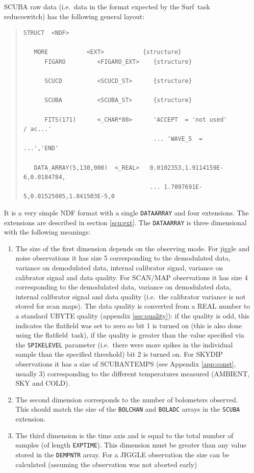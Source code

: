 \documentclass[twoside,11pt]{article}
\newenvironment{myquote}{\begin{quote}\begin{small}}{\end{small}\end{quote}}
\newcommand{\task}[1]{{\sf #1}}
\newcommand{\param}[1]{{\tt #1}}
\newcommand{\resw}{\xref{\task{reduce\_switch}}{sun216}{REDUCE_SWITCH}}
\newcommand{\flatf}{\xref{\task{flatfield}}{sun216}{FLATFIELD}}
\newcommand{\scusoft}          {{\sc Surf}}
\newcommand{\xref}[3]{#1}
\renewcommand{\_}{\texttt{\symbol{95}}}
\begin{document}
SCUBA raw data (i.e.\ data in the format expected by the \scusoft\ task
\resw) has the following general layout:

\begin{myquote}
\begin{verbatim}
STRUCT  <NDF>

   MORE           <EXT>           {structure}
      FIGARO         <FIGARO_EXT>    {structure}

      SCUCD          <SCUCD_ST>      {structure}
         
      SCUBA          <SCUBA_ST>      {structure}

      FITS(171)      <_CHAR*80>      'ACCEPT  = 'not used'           / ac...'
                                     ... 'WAVE_5  =                 ...','END'

   DATA_ARRAY(5,130,900)  <_REAL>   0.0102353,1.9114159E-6,0.0184784,
                                    ... 1.7097691E-5,0.01525085,1.841503E-5,0
\end{verbatim}
\end{myquote}
It is a very simple NDF format with a single \texttt{DATA\_ARRAY} and
four extensions. The extensions are described in section \ref{scu:ext}. 
The \texttt{DATA\_ARRAY} is three dimensional with the following meanings:

\begin{enumerate}
\item The size of the first dimension depends on the observing mode. For
jiggle and noise observations it has size 5 corresponding to the demodulated
data, variance on demodulated data, internal calibrator signal, variance on
calibrator signal and data quality. For SCAN/MAP observations it has size 4
corresponding to the demodulated data, variance on demodulated data, internal
calibrator signal and data quality (i.e.\ the calibrator variance is not
stored for scan maps). The data quality is converted from a REAL number to a
standard UBYTE quality (appendix \ref{sec:quality}): if the quality is odd,
this indicates the flatfield was set to zero so bit 1 is turned on (this is
also done using the \flatf\ task), if the quality is greater than the value
specified via the \param{SPIKE\_LEVEL} parameter (i.e.\ there were more spikes
in the individual sample than the specified threshold) bit 2 is turned on. For
SKYDIP observations it has a size of SCUBA\_\_N\_TEMPS (see Appendix
\ref{app:const}, usually 3) corresponding to the different temperatures
measured (AMBIENT, SKY and COLD).

\item The second dimension corresponds to the number of bolometers
observed. This should match the size of the \texttt{BOL\_CHAN} and
\texttt{BOL\_ADC} arrays in the \texttt{SCUBA} extension.

\item The third dimension is the time axis and is equal to the total number of 
samples (of length \texttt{EXP\_TIME}). This dimension must be greater than
any value stored in the \texttt{DEM\_PNTR} array. For a JIGGLE observation
the size can be calculated (assuming the observation was not aborted early)

\end{enumerate}
\end{document}
